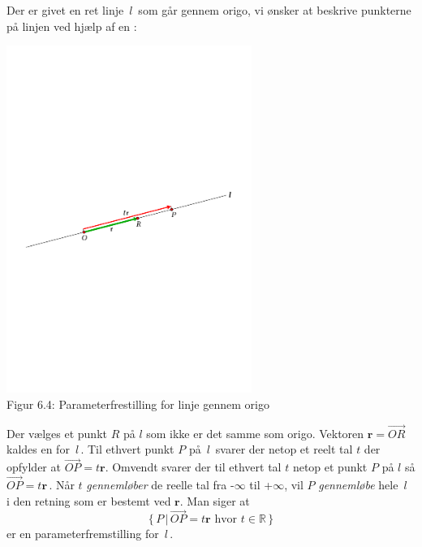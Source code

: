 \begin{example}
Der er givet en ret linje $\,l\,$ som går gennem origo, vi ønsker at beskrive punkterne på linjen ved hjælp af en :
\begin{center}
		\includegraphics[trim=1cm 12cm 1cm 12cm, width=0.60\textwidth,clip]{geometer/vektor7b.pdf}
		\\Figur 6.4: Parameterfrestilling for linje gennem origo		
\end{center}
Der vælges et punkt $R$ på $l$ som ikke er det samme som origo. Vektoren $\mathbf r=\stackrel{\rightarrow}{OR}$ kaldes en   for $\,l\,$. Til ethvert punkt $P$ på $\,l\,$ svarer der netop et reelt tal $t$ der opfylder at $\stackrel{\rightarrow}{OP}=t\mathbf r$. Omvendt svarer der til ethvert tal $t$ netop et punkt $P$ på $l$ så $\stackrel{\rightarrow}{OP}=t\mathbf r\,$. Når $t$ \textit{gennemløber} de reelle tal fra -$\infty$ til +$\infty$, vil $P$ \textit{gennemløbe} hele $\,l\,$ i den retning som er bestemt ved $\mathbf r$. Man siger at 
$$\{\,P\,|\,\stackrel{\rightarrow}{OP}=t\mathbf r\,\,\mathrm{hvor}\,\,t \in \mathbb R\,\}$$
er en parameterfremstilling for $\,l\,$.
\end{example}

